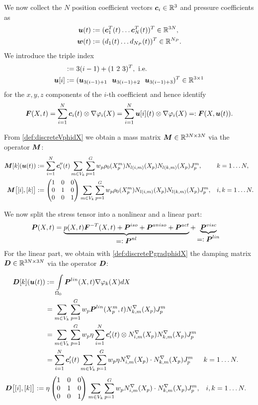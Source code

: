 We now collect the $N$ position coefficient vectors $\boldsymbol{c}_i \in\mathbb{R}^3$ and pressure coefficients as
\begin{align*}
	\boldsymbol{u}(t) &:= (\boldsymbol{c}_1^T(t) \ldots \boldsymbol{c}_N^T(t))^T \in\mathbb{R}^{3N},\\
	\boldsymbol{w}(t) &:= (d_1(t) \ldots d_{N_P}(t))^T \in\mathbb{R}^{N_P}.
\end{align*}
We introduce the triple index
\begin{align}
	[i] &:= 3(i-1)+(1~2~3)^T, \text{ i.e.}\\
	\vu[i] &:= (\vu_{3(i-1)+1}~~\vu_{3(i-1)+2}~~\vu_{3(i-1)+3})^T\in\R^{3\times 1}
\end{align}
for the $x,y,z$ components of the $i$-th coefficient and hence identify
\[
	\boldsymbol{F}(X,t) = \sum\limits_{i=1}^{N} \boldsymbol{c}_i(t)\otimes \nabla\varphi_i(X) = \sum\limits_{i=1}^{N} \boldsymbol{u}[i](t)\otimes \nabla\varphi_i(X) =: \boldsymbol{F}(X,\boldsymbol{u}(t)).
\]

From \eqref{def:discreteVphidX} we obtain a mass matrix $\boldsymbol{M}\in\mathbb{R}^{3N\times 3N}$ via the operator $\boldsymbol{M}$:
\begin{align*}
  \boldsymbol{M}[k](\boldsymbol{u}(t)) &:= \sum\limits_{i=1}^{N} \boldsymbol{c}_i''(t)\sum\limits_{m\in V_k}^{}\sum\limits_{p=1}^{G} w_p \rho_0(X^m_p)N_{l(i,m)}(X_p) N_{l(k,m)}(X_p)J^m_p, && k=1\ldots N,\\
	\boldsymbol{M}\bigl[[i],[k]\bigr] &:= \left(\begin{matrix}1&0&0\\0&1&0\\0&0&1\end{matrix}\right) \sum\limits_{m\in V_k}^{}\sum\limits_{p=1}^{G} w_p \rho_0(X^m_p)N_{l(i,m)}(X_p) N_{l(k,m)}(X_p)J^m_p, && i,k=1\ldots N.
\end{align*}
	
We now split the stress tensor into a nonlinear and a linear part:
\begin{align}
  \vP(X,t) &= \underbrace{p(X,t)\vF^{-T}(X,t) + \vPi + \vPa + \vPf}_{\displaystyle=:\vPnl} + \underbrace{\vPv}_{\displaystyle=:\vPl}
  \label{def:splitPnllin}
\end{align}
For the linear part, we obtain with \eqref{def:discretePgradphidX} the damping matrix $\boldsymbol{D}\in\mathbb{R}^{3N\times 3N}$ via the operator $\boldsymbol{D}$:
\begin{align}
    \boldsymbol{D}[k](\boldsymbol{u}(t))&:=
		\int\limits_{\Omega_0}^{}\boldsymbol{P}^{lin}(X,t)\nabla\varphi_{k}(X) dX \nonumber\\
		&=\sum\limits_{m\in V_k}^{}\sum\limits_{p=1}^{G} w_p\boldsymbol{P}^{lin}(X^m_p,t)N^\nabla_{k,m}(X_p)J^m_p\nonumber\\
		&=\sum\limits_{m\in V_k}^{}\sum\limits_{p=1}^{G} w_p \eta \sum\limits_{i=1}^{N} \boldsymbol{c}_i'(t) \otimes N^\nabla_{i,m}(X_p) N^\nabla_{k,m}(X_p)J^m_p\nonumber\\
		&=\sum\limits_{i=1}^{N} \boldsymbol{c}_i'(t) \sum\limits_{m\in V_k}^{}\sum\limits_{p=1}^{G} w_p \eta N^\nabla_{i,m}(X_p) \cdot N^\nabla_{k,m}(X_p)J^m_p
		&& k=1\ldots N.\label{def:discretePviscgradphidX}
\end{align}
\begin{align*}
	\boldsymbol{D}\bigl[[i],[k]\bigr] &:= \eta\left(\begin{matrix}1&0&0\\0&1&0\\0&0&1\end{matrix}\right) \sum\limits_{m\in V_k}^{}\sum\limits_{p=1}^{G} w_p N^\nabla_{i,m}(X_p) \cdot N^\nabla_{k,m}(X_p) J^m_p, && i,k=1\ldots N.
\end{align*}

